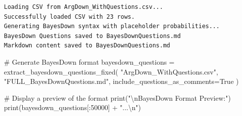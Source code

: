 \documentclass[
  11pt,
  letterpaper,
]{book}
\newenvironment{Shaded}{\begin{snugshade}}{\end{snugshade}}
\newcommand{\BuiltInTok}[1]{\textcolor[rgb]{0.00,0.23,0.31}{#1}}
\newcommand{\CharTok}[1]{\textcolor[rgb]{0.13,0.47,0.30}{#1}}
\newcommand{\CommentTok}[1]{\textcolor[rgb]{0.37,0.37,0.37}{#1}}
\newcommand{\DecValTok}[1]{\textcolor[rgb]{0.68,0.00,0.00}{#1}}
\newcommand{\NormalTok}[1]{\textcolor[rgb]{0.00,0.23,0.31}{#1}}
\newcommand{\OperatorTok}[1]{\textcolor[rgb]{0.37,0.37,0.37}{#1}}
\newcommand{\StringTok}[1]{\textcolor[rgb]{0.13,0.47,0.30}{#1}}
\newcommand{\VariableTok}[1]{\textcolor[rgb]{0.07,0.07,0.07}{#1}}
\begin{document}
\begin{verbatim}
Loading CSV from ArgDown_WithQuestions.csv...
Successfully loaded CSV with 23 rows.
Generating BayesDown syntax with placeholder probabilities...
BayesDown Questions saved to BayesDownQuestions.md
Markdown content saved to BayesDownQuestions.md
\end{verbatim}

\begin{Shaded}
\begin{Highlighting}[]
\CommentTok{\# Generate BayesDown format}
\NormalTok{bayesdown\_questions }\OperatorTok{=}\NormalTok{ extract\_bayesdown\_questions\_fixed(}
    \StringTok{"ArgDown\_WithQuestions.csv"}\NormalTok{,}
    \StringTok{"FULL\_BayesDownQuestions.md"}\NormalTok{,}
\NormalTok{    include\_questions\_as\_comments}\OperatorTok{=}\VariableTok{True}
\NormalTok{)}

\CommentTok{\# Display a preview of the format}
\BuiltInTok{print}\NormalTok{(}\StringTok{"}\CharTok{\textbackslash{}n}\StringTok{BayesDown Format Preview:"}\NormalTok{)}
\BuiltInTok{print}\NormalTok{(bayesdown\_questions[:}\DecValTok{50000}\NormalTok{] }\OperatorTok{+} \StringTok{"...}\CharTok{\textbackslash{}n}\StringTok{"}\NormalTok{)}
\end{Highlighting}
\end{Shaded}
\end{document}
